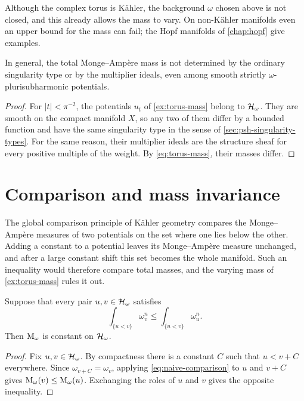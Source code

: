 Although the complex torus is K\"ahler, the background $\omega$ chosen above is not closed, and this already allows the mass to vary. On non-K\"ahler manifolds even an upper bound for the mass can fail; the Hopf manifolds of \cref{chap:hopf} give examples.

\begin{corollary}\label{cor:mass-not-singularity-invariant}
In general, the total Monge--Amp\`ere mass is not determined by the ordinary singularity type or by the multiplier ideals, even among smooth strictly $\omega$-plurisubharmonic potentials.
\end{corollary}
\begin{proof}
For $|t|<\pi^{-2}$, the potentials $u_t$ of \cref{ex:torus-mass} belong to $\mathcal H_\omega$. They are smooth on the compact manifold $X$, so any two of them differ by a bounded function and have the same singularity type in the sense of \cref{sec:psh-singularity-types}. For the same reason, their multiplier ideals are the structure sheaf for every positive multiple of the weight. By \eqref{eq:torus-mass}, their masses differ.
\end{proof}

\section{Comparison and mass invariance}

The global comparison principle of K\"ahler geometry compares the Monge--Amp\`ere measures of two potentials on the set where one lies below the other. Adding a constant to a potential leaves its Monge--Amp\`ere measure unchanged, and after a large constant shift this set becomes the whole manifold. Such an inequality would therefore compare total masses, and the varying mass of \cref{ex:torus-mass} rules it out.

\begin{proposition}\label{prop:comparison-forces-mass}
Suppose that every pair $u,v\in\mathcal H_\omega$ satisfies
\begin{equation}\label{eq:naive-comparison}
 \int_{\{u<v\}}\omega_v^n
 \leq\int_{\{u<v\}}\omega_u^n.
\end{equation}
Then $\mathrm M_\omega$ is constant on $\mathcal H_\omega$.
\end{proposition}
\begin{proof}
Fix $u,v\in\mathcal H_\omega$. By compactness there is a constant $C$ such that $u<v+C$ everywhere. Since $\omega_{v+C}=\omega_v$, applying \eqref{eq:naive-comparison} to $u$ and $v+C$ gives $\mathrm M_\omega(v)\leq\mathrm M_\omega(u)$. Exchanging the roles of $u$ and $v$ gives the opposite inequality.
\end{proof}

